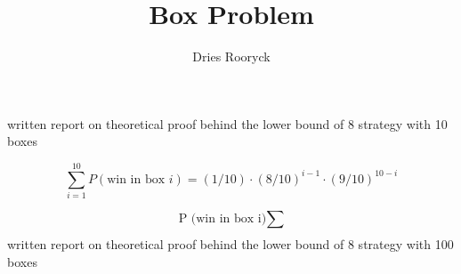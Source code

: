 \documentclass{report}
\title{Box Problem}
\author{Dries Rooryck}
\begin{document}
	\maketitle

written report on theoretical proof behind the lower bound of 8 strategy with 10 boxes

 \[ \sum_{i=1}^{10} P(\textrm{win in box }i) = (1/10)\cdot(8/10)^{i-1}\cdot(9/10)^{10-i} \]


\[
\textrm{P (win in box i)} \sum_{}
\]
written report on theoretical proof behind the lower bound of 8 strategy with 100 boxes
\end{document}
